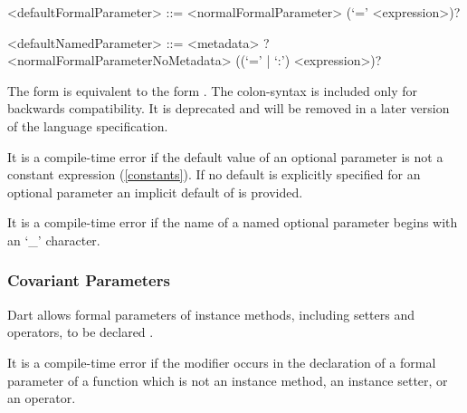 \documentclass[makeidx]{article}
\begin{document}
\begin{grammar}
<defaultFormalParameter> ::= <normalFormalParameter> (`=' <expression>)?

<defaultNamedParameter> ::= \gnewline{}
  <metadata> \REQUIRED? <normalFormalParameterNoMetadata>
  \gnewline{} ((`=' | `:') <expression>)?
\end{grammar}

The form 
is equivalent to the form
.
The colon-syntax is included only for backwards compatibility.
It is deprecated and will be removed in
a later version of the language specification.

\LMHash{}%
It is a compile-time error if the default value of an optional parameter is
not a constant expression (\ref{constants}).
If no default is explicitly specified for an optional parameter
an implicit default of \NULL{} is provided.

\LMHash{}%
It is a compile-time error if the name of a named optional parameter
begins with an `_' character.



\subsubsection{Covariant Parameters}

\LMHash{}%
Dart allows formal parameters of instance methods,
including setters and operators,
to be declared \COVARIANT.


\LMHash{}%
It is a compile-time error if the modifier \COVARIANT{} occurs
in the declaration of a formal parameter of a function
which is not an instance method, an instance setter, or an operator.
\end{document}
